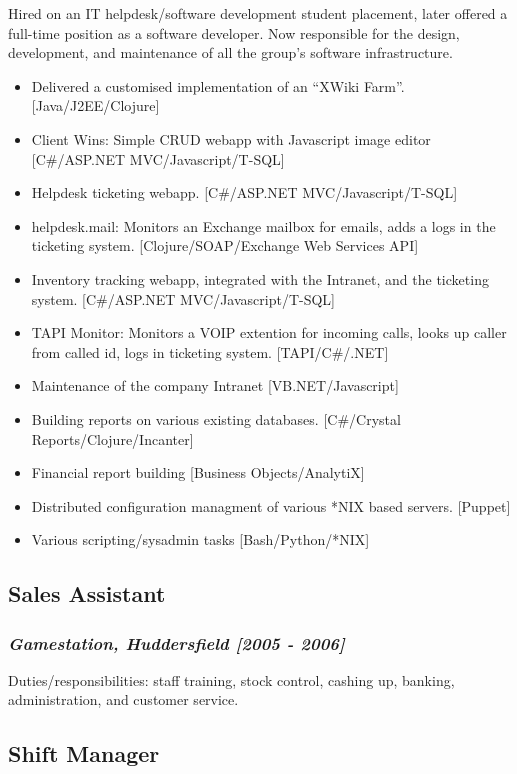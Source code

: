 \documentclass{article}
\begin{document}
Hired on an IT helpdesk/software development student placement, later offered a full-time position as a software developer. Now responsible for the design, development, and maintenance of all the group's software infrastructure.
\begin{itemize}
\item Delivered a customised implementation of an ``XWiki Farm''. [Java/J2EE/Clojure]
\item Client Wins: Simple CRUD webapp with Javascript image editor [C\#/ASP.NET MVC/Javascript/T-SQL]
\item Helpdesk ticketing webapp. [C\#/ASP.NET MVC/Javascript/T-SQL]
\item helpdesk.mail: Monitors an Exchange mailbox for emails, adds a logs in the ticketing system. [Clojure/SOAP/Exchange Web Services API]
\item Inventory tracking webapp, integrated with the Intranet, and the ticketing system. [C\#/ASP.NET MVC/Javascript/T-SQL]
\item TAPI Monitor: Monitors a VOIP extention for incoming calls, looks up caller from called id, logs in ticketing system. [TAPI/C\#/.NET]
\item Maintenance of the company Intranet [VB.NET/Javascript]
\item Building reports on various existing databases. [C\#/Crystal Reports/Clojure/Incanter]
\item Financial report building [Business Objects/AnalytiX]
\item Distributed configuration managment of various *NIX based servers. [Puppet]
\item Various scripting/sysadmin tasks [Bash/Python/*NIX]
\end{itemize}
\subsection*{Sales Assistant}
\label{sec-3.2}

\subsubsection*{\emph{Gamestation, Huddersfield [2005 - 2006]}}
\label{sec-3.2.1}

Duties/responsibilities: staff training, stock control, cashing up, banking, administration, and customer service.
\subsection*{Shift Manager}
\label{sec-3.3}
\end{document}
